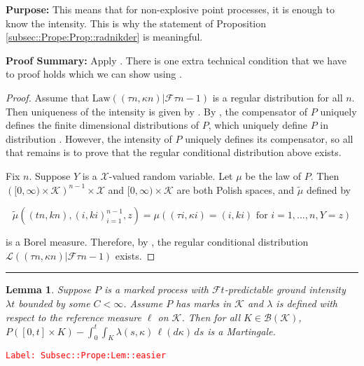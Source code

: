 \documentclass[12pt]{article}
\newcommand{\mc}{\mathcal}
\newcommand{\ms}{\mathscr}
\newcommand{\te}{\text}
\newcommand{\tr}{\textcolor{red}}
\newcommand{\labe}[1]{\tr{\texttt{Label: #1}}}
\newcommand{\purpose}{\textbf{Purpose: }}
\newcommand{\pfsum}{\textbf{Proof Summary: }}
\newcommand{\ind}{\hspace{24pt}}
\newcommand{\lin}{\rule{\linewidth}{0.4 pt}}
\renewcommand{\S}{S}							%
\renewcommand{\t}{t}							%
\renewcommand{\tt}{s}							%
\newcommand{\F}{\mc{F}}							%
\newcommand{\const}{C}							%
\newcommand{\Sm}{\ell}							%
\newcommand{\rate}{\lambda}						%
\newcommand{\alt}[1]{\widetilde{#1}}			%
\newcommand{\m}{\mu}							%
\newcommand{\law}{\te{Law}}						%
\newcommand{\XX}{Y}								%
\newcommand{\rt}{\tau}							%
\renewcommand{\mark}{\kappa}					%
\newcommand{\rp}{P}								%
\newcommand{\spce}{\mc{X}}						%
\newcommand{\mspce}{\mc{K}}						%
\newtheorem{lem}[thms]{Lemma}
\begin{document}
\purpose This means that for non-explosive point processes, it is enough to know the intensity. This is why the statement of Proposition \ref{subsec::Prope:Prop::radnikder} is meaningful.

\pfsum Apply \cite[Propositions 14.3.II(b),14.2.IV(c) and 9.2.III]{DalVer08}. There is one extra technical condition that we have to proof holds which we can show using \cite[Proposition A1.5.III]{DalVer03}.

\begin{proof}
Assume that \(\law((\rt{n},\mark{n})|\F{\rt{n-1}})\) is a regular distribution for all \(n\). Then uniqueness of the intensity is given by \cite[Proposition 14.3.II (b)]{DalVer08}. By \cite[Proposition 14.2.IV (c)]{DalVer08}, the compensator of \(\rp\) uniquely defines the finite dimensional distributions of \(\rp\), which uniquely define \(\rp\) in distribution \cite[Proposition 9.2.III]{DalVer08}. However, the intensity of \(\rp\) uniquely defines its compensator, so all that remains is to prove that the regular conditional distribution above exists.

\ind Fix \(n\). Suppose \(\XX\) is a \(\spce\)-valued random variable. Let \(\m\) be the law of \(\rp\). Then \(\left([0,\infty)\times \mspce\right)^{n-1}\times\spce\) and \([0,\infty)\times \mspce\) are both Polish spaces, and \(\alt{\m}\) defined by 

\[\alt{\m}((\t{n},k{n}),(	{i},k{i})_{i=1}^{n-1},z) = \m\left((\rt{i},\mark{i}) = (	{i},k{i})\te{ for } i=1,\dots,n, \XX = z\right)\]

is a Borel measure. Therefore, by \cite[Proposition A1.5.III]{DalVer03}, the regular conditional distribution \(\ms{L}((\rt{n},\mark{n})|\F{\rt{n-1}})\) exists.
\end{proof}


\lin

\begin{lem}
Suppose \(\rp\) is a marked process with \(\F{\t}\)-predictable ground intensity \(\rate{\t}\) bounded by some \(\const < \infty\). Assume \(\rp\) has marks in \(\mspce\) and \(\rate\) is defined with respect to the reference measure \(\Sm\) on \(\mspce\). Then for all \(K \in \ms{B}(\mspce)\), \(\rp([0,\t]\times K) - \int_0^\t\int_K \rate(\tt,\mark)\,\ell(d\mark)\,ds\) is a Martingale.
\label{Subsec::Prope:Lem::easier}
\end{lem}
\labe{Subsec::Prope:Lem::easier}
\end{document}
